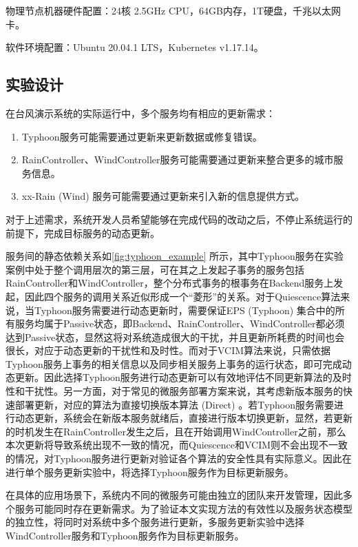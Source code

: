 \documentclass[macfonts,master]{njuthesis}
\begin{document}
物理节点机器硬件配置：24核 2.5GHz CPU，64GB内存，1T硬盘，千兆以太网卡。

软件环境配置：Ubuntu 20.04.1 LTS，Kubernetes v1.17.14。

\subsection{实验设计}\label{sec:experiment_design}
在台风演示系统的实际运行中，多个服务均有相应的更新需求：

\begin{enumerate}
	\item Typhoon服务可能需要通过更新来更新数据或修复错误。
	\item RainController、WindController服务可能需要通过更新来整合更多的城市服务信息。
	\item xx-Rain (Wind) 服务可能需要通过更新来引入新的信息提供方式。
\end{enumerate}

对于上述需求，系统开发人员希望能够在完成代码的改动之后，不停止系统运行的前提下，完成目标服务的动态更新。

服务间的静态依赖关系如\ref{fig:typhoon_example} 所示，其中Typhoon服务在实验案例中处于整个调用层次的第三层，可在其之上发起子事务的服务包括RainController和WindController，整个分布式事务的根事务在Backend服务上发起，因此四个服务的调用关系近似形成一个“菱形”的关系。对于Quiescence算法来说，当Typhoon服务需要进行动态更新时，需要保证EPS (Typhoon) 集合中的所有服务均属于Passive状态，即Backend、RainController、WindController都必须达到Passive状态，显然这将对系统造成很大的干扰，并且更新所耗费的时间也会很长，对应于动态更新的干扰性和及时性。而对于VCIM算法来说，只需依据Typhoon服务上事务的相关信息以及同步相关服务上事务的运行状态，即可完成动态更新。因此选择Typhoon服务进行动态更新可以有效地评估不同更新算法的及时性和干扰性。另一方面，对于常见的微服务部署方案来说，其考虑新版本服务的快速部署更新，对应的算法为直接切换版本算法 (Direct) 。若Typhoon服务需要进行动态更新，系统会在新版本服务就绪后，直接进行版本切换更新，显然，若更新的时机发生在RainController发生之后，且在开始调用WindController之前，那么本次更新将导致系统出现不一致的情况，而Quiescence和VCIM则不会出现不一致的情况，对Typhoon服务进行更新对验证各个算法的安全性具有实际意义。因此在进行单个服务更新实验中，将选择Typhoon服务作为目标更新服务。

在具体的应用场景下，系统内不同的微服务可能由独立的团队来开发管理，因此多个服务可能同时存在更新需求。为了验证本文实现方法的有效性以及服务状态模型的独立性，将同时对系统中多个服务进行更新，多服务更新实验中选择WindController服务和Typhoon服务作为目标更新服务。
\end{document}
